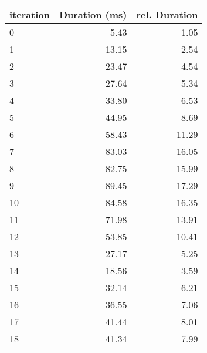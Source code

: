 \documentclass[english,11pt,a4paper,table]{article} %
\begin{document}
\begin{table}[H]
	\centering
	\begin{tabular}{l|rr}
		\toprule
		iteration & Duration (ms) & rel. Duration                                         \\
		\midrule
		0         & 5.43          & {\cellcolor[HTML]{00441B}} \color[HTML]{F1F1F1} 1.05  \\
		1         & 13.15         & {\cellcolor[HTML]{006328}} \color[HTML]{F1F1F1} 2.54  \\
		2         & 23.47         & {\cellcolor[HTML]{19833E}} \color[HTML]{F1F1F1} 4.54  \\
		3         & 27.64         & {\cellcolor[HTML]{278F48}} \color[HTML]{F1F1F1} 5.34  \\
		4         & 33.80         & {\cellcolor[HTML]{38A156}} \color[HTML]{F1F1F1} 6.53  \\
		5         & 44.95         & {\cellcolor[HTML]{68BE70}} \color[HTML]{000000} 8.69  \\
		6         & 58.43         & {\cellcolor[HTML]{A3DA9D}} \color[HTML]{000000} 11.29 \\
		7         & 83.03         & {\cellcolor[HTML]{ECF8E8}} \color[HTML]{000000} 16.05 \\
		8         & 82.75         & {\cellcolor[HTML]{ECF8E8}} \color[HTML]{000000} 15.99 \\
		9         & 89.45         & {\cellcolor[HTML]{F7FCF5}} \color[HTML]{000000} 17.29 \\
		10        & 84.58         & {\cellcolor[HTML]{EFF9EC}} \color[HTML]{000000} 16.35 \\
		11        & 71.98         & {\cellcolor[HTML]{D1EDCB}} \color[HTML]{000000} 13.91 \\
		12        & 53.85         & {\cellcolor[HTML]{90D18D}} \color[HTML]{000000} 10.41 \\
		13        & 27.17         & {\cellcolor[HTML]{258D47}} \color[HTML]{F1F1F1} 5.25  \\
		14        & 18.56         & {\cellcolor[HTML]{097532}} \color[HTML]{F1F1F1} 3.59  \\
		15        & 32.14         & {\cellcolor[HTML]{339C52}} \color[HTML]{F1F1F1} 6.21  \\
		16        & 36.55         & {\cellcolor[HTML]{40AA5D}} \color[HTML]{F1F1F1} 7.06  \\
		17        & 41.44         & {\cellcolor[HTML]{58B668}} \color[HTML]{F1F1F1} 8.01  \\
		18        & 41.34         & {\cellcolor[HTML]{56B567}} \color[HTML]{F1F1F1} 7.99  \\

\end{tabular}
\end{table}
\end{document}
